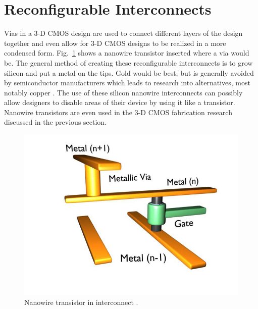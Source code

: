 \documentclass[conference]{IEEEtran}
\begin{document}
\section{Reconfigurable Interconnects}
Vias in a 3-D CMOS design are used to connect different layers of the design together and
even allow for 3-D CMOS designs to be realized in a more condensed form. Fig.~\ref{fig:nanowire_transistor}
shows a nanowire transistor inserted where a via would be. The general method of creating these
reconfigurable interconnects is to grow silicon and put a metal on the tips. Gold would be best,
but is generally avoided by semiconductor manufacturers which leads to research into alternatives,
most notably copper \cite{5510748}. The use of these silicon nanowire interconnects can possibly
allow designers to disable areas of their device by using it like a transistor. Nanowire transistors
are even used in the 3-D CMOS fabrication research discussed in the previous section.
\begin{figure}[!htb]
    \centering
    \includegraphics[width=\linewidth]{figures/nanowire_transistor.png}
    \caption{Nanowire transistor in interconnect \cite{5510748}.}\label{fig:nanowire_transistor}
\end{figure}
\end{document}
